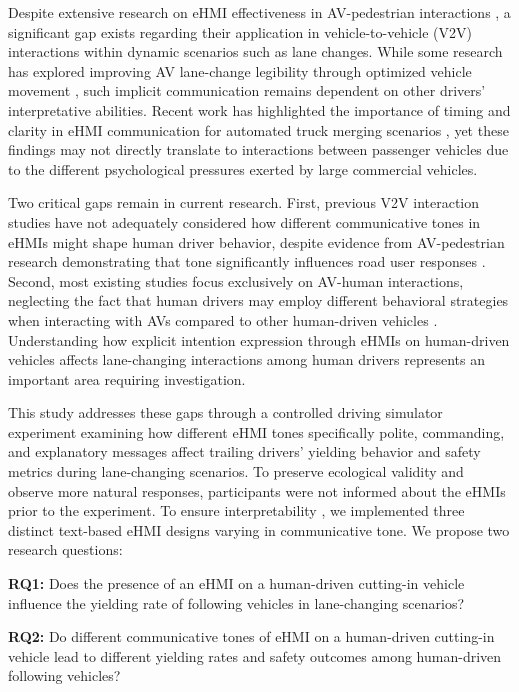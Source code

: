\documentclass[manuscript,review]{acmart}
\begin{document}
Despite extensive research on eHMI effectiveness in AV-pedestrian interactions \cite{dey2020taming, hollaender2019investigating}, a significant gap exists regarding their application in vehicle-to-vehicle (V2V) interactions within dynamic scenarios such as lane changes. While some research has explored improving AV lane-change legibility through optimized vehicle movement \cite{lee2023coming}, such implicit communication remains dependent on other drivers' interpretative abilities. Recent work has highlighted the importance of timing and clarity in eHMI communication for automated truck merging scenarios \cite{gwak2025encounter}, yet these findings may not directly translate to interactions between passenger vehicles due to the different psychological pressures exerted by large commercial vehicles.

Two critical gaps remain in current research. First, previous V2V interaction studies have not adequately considered how different communicative tones in eHMIs might shape human driver behavior, despite evidence from AV-pedestrian research demonstrating that tone significantly influences road user responses \cite{colley2021investigating}. Second, most existing studies focus exclusively on AV-human interactions, neglecting the fact that human drivers may employ different behavioral strategies when interacting with AVs compared to other human-driven vehicles \cite{huang2022sharing}. Understanding how explicit intention expression through eHMIs on human-driven vehicles affects lane-changing interactions among human drivers represents an important area requiring investigation.

This study addresses these gaps through a controlled driving simulator experiment examining how different eHMI tones specifically polite, commanding, and explanatory messages affect trailing drivers' yielding behavior and safety metrics during lane-changing scenarios. To preserve ecological validity and observe more natural responses, participants were not informed about the eHMIs prior to the experiment. To ensure interpretability \cite{colley2021investigating}, we implemented three distinct text-based eHMI designs varying in communicative tone. We propose two research questions:

\textbf{RQ1:} Does the presence of an eHMI on a human-driven cutting-in vehicle influence the yielding rate of following vehicles in lane-changing scenarios?

\textbf{RQ2:} Do different communicative tones of eHMI on a human-driven cutting-in vehicle lead to different yielding rates and safety outcomes among human-driven following vehicles?
\end{document}
